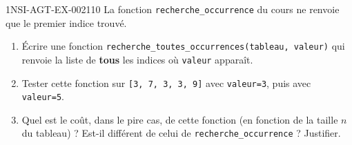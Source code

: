 \begin{exercice}{1NSI-AGT-EX-002}{1}{10}
La fonction \lstinline{recherche_occurrence} du cours ne renvoie que le premier indice
trouvé.
\begin{enumerate}
  \item Écrire une fonction \lstinline{recherche_toutes_occurrences(tableau, valeur)} qui renvoie la liste de \textbf{tous} les indices où \lstinline{valeur} apparaît.
  \item Tester cette fonction sur \lstinline{[3, 7, 3, 3, 9]} avec \lstinline{valeur=3}, puis avec \lstinline{valeur=5}.
  \item Quel est le coût, dans le pire cas, de cette fonction (en fonction de la taille $n$ du tableau) ? Est-il différent de celui de \lstinline{recherche_occurrence} ? Justifier.
\end{enumerate}
\end{exercice}

